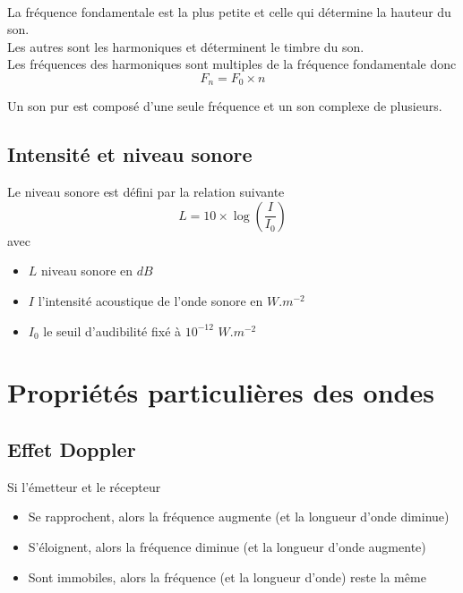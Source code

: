 \documentclass[a4paper]{article}
\begin{document}
\begin{center}
\begin{center}
\\
\caption{Analyse spectrale d'un son}	
\end{center}

{La fréquence fondamentale est la plus petite et celle qui détermine la hauteur du son.}\\
{Les autres sont les harmoniques et déterminent le timbre du son.}\\

{Les fréquences des harmoniques sont multiples de la fréquence fondamentale donc}
\[F_n=F_0\times n\]

{Un son pur est composé d'une seule fréquence et un son complexe de plusieurs.}

\subsection{Intensité et niveau sonore}
{Le niveau sonore est défini par la relation suivante}
\[L=10\times \log \left(\frac{I}{I_0}\right)\]
{avec}
\begin{itemize}
  	\item{$L$ niveau sonore en $dB$}
  	\item{$I$ l'intensité acoustique de l'onde sonore en $W$.$m^{-2}$}
  	\item{$I_0$ le seuil d'audibilité fixé à $10^{-12}$ $W$.$m^{-2}$}
\end{itemize}

\section{Propriétés particulières des ondes}
\subsection{Effet Doppler}
{Si l'émetteur et le récepteur}
\begin{itemize}
  	\item{Se rapprochent, alors la fréquence augmente (et la longueur d'onde diminue)}
  	\item{S'éloignent, alors la fréquence diminue (et la longueur d'onde augmente)}
  	\item{Sont immobiles, alors la fréquence (et la longueur d'onde) reste la même}
\end{itemize}



\end{center}
\end{document}
